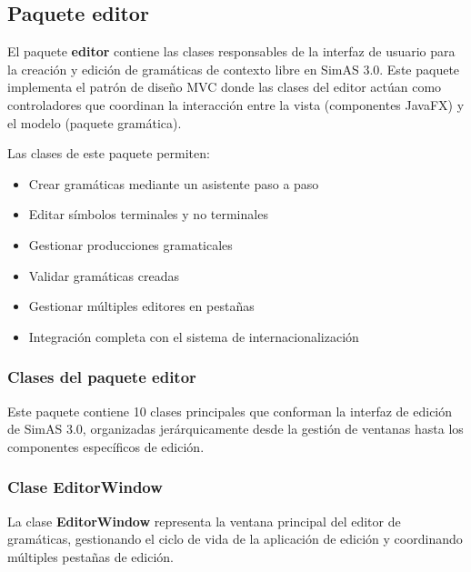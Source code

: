 \subsection{Paquete editor}

El paquete \textbf{editor} contiene las clases responsables de la interfaz de usuario para la creación y edición de gramáticas de contexto libre en SimAS 3.0. Este paquete implementa el patrón de diseño MVC donde las clases del editor actúan como controladores que coordinan la interacción entre la vista (componentes JavaFX) y el modelo (paquete gramática).

Las clases de este paquete permiten:
\begin{itemize}
    \item Crear gramáticas mediante un asistente paso a paso
    \item Editar símbolos terminales y no terminales
    \item Gestionar producciones gramaticales
    \item Validar gramáticas creadas
    \item Gestionar múltiples editores en pestañas
    \item Integración completa con el sistema de internacionalización
\end{itemize}

\subsubsection{Clases del paquete editor}

Este paquete contiene 10 clases principales que conforman la interfaz de edición de SimAS 3.0, organizadas jerárquicamente desde la gestión de ventanas hasta los componentes específicos de edición.

\subsubsection{Clase EditorWindow}

La clase \textbf{EditorWindow} representa la ventana principal del editor de gramáticas, gestionando el ciclo de vida de la aplicación de edición y coordinando múltiples pestañas de edición.

